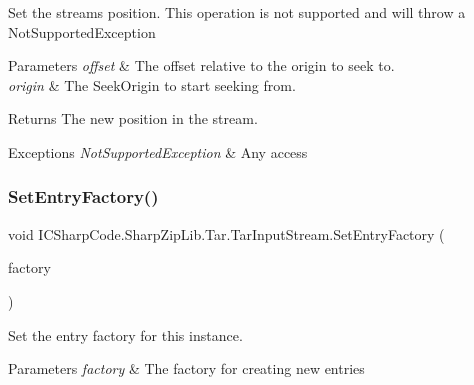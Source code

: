 Set the streams position. This operation is not supported and will throw a Not\+Supported\+Exception 


\begin{DoxyParams}{Parameters}
{\em offset} & The offset relative to the origin to seek to.\\
\hline
{\em origin} & The Seek\+Origin to start seeking from.\\
\hline
\end{DoxyParams}
\begin{DoxyReturn}{Returns}
The new position in the stream.
\end{DoxyReturn}

\begin{DoxyExceptions}{Exceptions}
{\em Not\+Supported\+Exception} & Any access\\
\hline
\end{DoxyExceptions}
\mbox{\label{class_i_c_sharp_code_1_1_sharp_zip_lib_1_1_tar_1_1_tar_input_stream_a9d78240fd9fa35d7855939ab89c84e47}} 
\subsubsection{\texorpdfstring{Set\+Entry\+Factory()}{SetEntryFactory()}}
{\footnotesize\ttfamily void I\+C\+Sharp\+Code.\+Sharp\+Zip\+Lib.\+Tar.\+Tar\+Input\+Stream.\+Set\+Entry\+Factory (\begin{DoxyParamCaption}\item[{\hyperlink{interface_i_c_sharp_code_1_1_sharp_zip_lib_1_1_tar_1_1_tar_input_stream_1_1_i_entry_factory}{I\+Entry\+Factory}}]{factory }\end{DoxyParamCaption})\hspace{0.3cm}{\ttfamily [inline]}}



Set the entry factory for this instance. 


\begin{DoxyParams}{Parameters}
{\em factory} & The factory for creating new entries\\
\hline
\end{DoxyParams}
\mbox{\label{class_i_c_sharp_code_1_1_sharp_zip_lib_1_1_tar_1_1_tar_input_stream_a81fe60e776e8fba0a582a18dcd410113}} 
